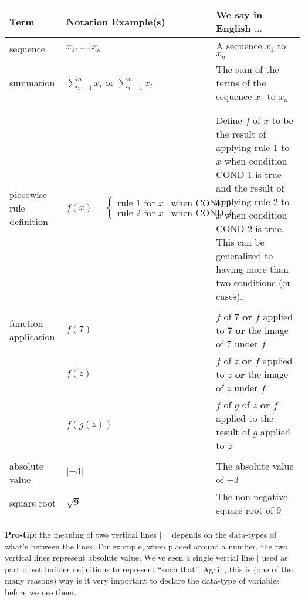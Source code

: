 \documentclass[12pt, oneside]{article}
\begin{document}
\begin{center}
\begin{tabular}{|p{1.2in}p{2.8in}p{3in}|}
\hline
{\bf Term} & {\bf Notation Example(s)} & {\bf We say in English \ldots } \\
\hline
sequence & $x_1, \ldots, x_n$ & A sequence $x_1$ to $x_n$ \\
summation & $\sum_{i=1}^n x_i$ or $\displaystyle{\sum_{i=1}^n x_i}$ & The sum of the terms of the sequence $x_1$ to $x_n$ \\
&&\\
&&\\
piecewise rule definition & $f(x) = \begin{cases} \text{rule 1 for } x & \text{when~COND 1} \\ \text{rule 2 for } x & \text{when COND 2}\end{cases}$ &
Define $f$ of $x$ to be the result of applying rule 1 to $x$ when condition COND 1 is true and the result of 
applying rule 2 to $x$ when condition COND 2 is true. This can be generalized to having more than two conditions
(or cases).\\
&&\\
function application & $f(7)$ & $f$ of $7$ {\bf or} $f$ applied to $7$ {\bf or} the image of $7$ under $f$\\
                     & $f(z)$ & $f$ of $z$ {\bf or} $f$ applied to $z$ {\bf or} the image of $z$ under $f$\\
                     & $f(g(z))$ & $f$ of $g$ of $z$ {\bf or} $f$ applied to the result of $g$ applied to $z$ \\
&&\\
absolute value & $\lvert -3 \rvert$ & The absolute value of $-3$ \\
square root & $\sqrt{9}$ & The non-negative square root of $9$ \\


\hline
\end{tabular}
\end{center}

{\bf Pro-tip}: the meaning of two vertical lines $| ~~~ |$ depends on the data-types of what's between the lines.
For example, when placed around a number, the two vertical lines represent absolute value.
We've seen a single vertial line $|$ used as part of set builder definitions to represent ``such that''.
Again, this is 
(one of the many reasons) why is it very important to declare the data-type of variables before we use them.
 \vfill
\end{document}
